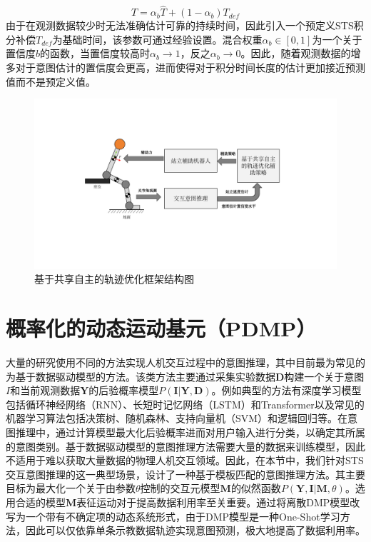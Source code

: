\begin{equation}
    T=\alpha_b \hat T + (1-\alpha_b)T_{def}
    \label{eq:4-3}
\end{equation}
由于在观测数据较少时无法准确估计可靠的持续时间，因此引入一个预定义STS积分补偿$T_{def}$为基础时间，该参数可通过经验设置。混合权重$\alpha_b \in [0,1]$为一个关于置信度$b$的函数，当置信度较高时$\alpha_b \rightarrow 1$，反之$\alpha_b \rightarrow 0$。因此，随着观测数据的增多对于意图估计的置信度会更高，进而使得对于积分时间长度的估计更加接近预测值而不是预定义值。

\begin{figure}[htb]
    \centering\includegraphics[width=1\textwidth]{figures/4-Fig-2.pdf}
    \caption{基于共享自主的轨迹优化框架结构图}
    \label{fig:4-2}
\end{figure}

\section{概率化的动态运动基元（PDMP）} 
大量的研究使用不同的方法实现人机交互过程中的意图推理，其中目前最为常见的为基于数据驱动模型的方法。该类方法主要通过采集实验数据$\mathbf{D}$构建一个关于意图$I$和当前观测数据$\mathbf{Y}$的后验概率模型$P(\mathbf{I}|\mathbf{Y},\mathbf{D})$。例如典型的方法有深度学习模型包括循环神经网络（RNN）、长短时记忆网络（LSTM）和Transformer以及常见的机器学习算法包括决策树、随机森林、支持向量机（SVM）和逻辑回归等。在意图推理中，通过计算模型最大化后验概率进而对用户输入进行分类，以确定其所属的意图类别。基于数据驱动模型的意图推理方法需要大量的数据来训练模型，因此不适用于难以获取大量数据的物理人机交互领域。因此，在本节中，我们针对STS交互意图推理的这一典型场景，设计了一种基于模板匹配的意图推理方法。其主要目标为最大化一个关于由参数$\theta$控制的交互元模型$\mathbf{M}$的似然函数$P(\mathbf{Y},\mathbf{I}|\mathbf{M},\theta)$。选用合适的模型$\mathbf{M}$表征运动对于提高数据利用率至关重要。通过将离散DMP模型改写为一个带有不确定项的动态系统形式，由于DMP模型是一种One-Shot学习方法，因此可以仅依靠单条示教数据轨迹实现意图预测，极大地提高了数据利用率。

